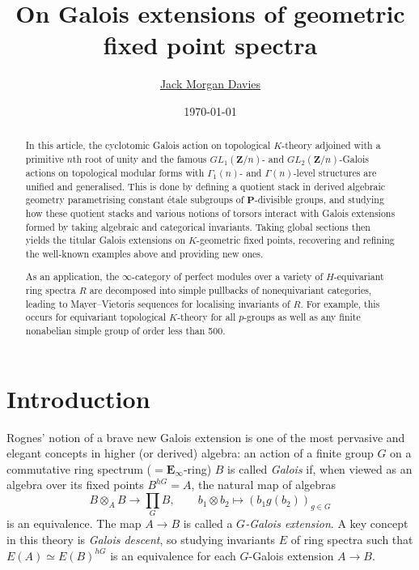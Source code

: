 \documentclass[11pt, a4paper]{article}
\newcommand{\1}{\mathbf{1}}
\newcommand{\E}{\mathbf{E}}
\renewcommand{\P}{\mathbf{P}}
\newcommand{\Z}{\mathbf{Z}}
\newcommand{\Ga}{\Gamma}
\theoremstyle{plain}
\theoremstyle{definition}
\theoremstyle{remark}\numberwithin{equation}{section}
\begin{document}
\title{
On Galois extensions of geometric fixed point spectra
}
%

\author{\href{http://www.jmdavies.org}{Jack Morgan Davies}%
}
\date{\today}
\maketitle

\begin{abstract}
    In this article, the cyclotomic Galois action on topological $K$-theory adjoined with a primitive $n$th root of unity and the famous $GL_1(\Z/n)$- and $GL_2(\Z/n)$-Galois actions on topological modular forms with $\Ga_1(n)$- and $\Gamma(n)$-level structures are unified and generalised. This is done by defining a quotient stack in derived algebraic geometry parametrising constant étale subgroups of $\P$-divisible groups, and studying how these quotient stacks and various notions of torsors interact with Galois extensions formed by taking algebraic and categorical invariants. Taking global sections then yields the titular Galois extensions on $K$-geometric fixed points, recovering and refining the well-known examples above and providing new ones.
    
    As an application, the $\infty$-category of perfect modules over a variety of $H$-equivariant ring spectra $R$ are decomposed into simple pullbacks of nonequivariant categories, leading to Mayer--Vietoris sequences for localising invariants of $R$. For example, this occurs for equivariant topological $K$-theory for all $p$-groups as well as any finite nonabelian simple group of order less than 500.
\end{abstract}    

\setcounter{tocdepth}{2}
\tableofcontents

\section{Introduction}
Rognes' notion of a brave new Galois extension \cite{rognes_ICM_algebraic_K-theory} is one of the most pervasive and elegant concepts in higher (or derived) algebra: an action of a finite group $G$ on a commutative ring spectrum ($= \E_\infty$-ring) $B$ is called \emph{Galois} if, when viewed as an algebra over its fixed points $B^{hG} = A$, the natural map of algebras
\[B\otimes_A B \to \prod_G B, \qquad b_1\otimes b_2\mapsto (b_1 g(b_2))_{g\in G}\]
is an equivalence. The map $A \to B$ is called a \emph{$G$-Galois extension}. A key concept in this theory is \emph{Galois descent}, so studying invariants $E$ of ring spectra such that $E(A) \simeq E(B)^{hG}$ is an equivalence for each $G$-Galois extension $A \to B$.
\end{document}
